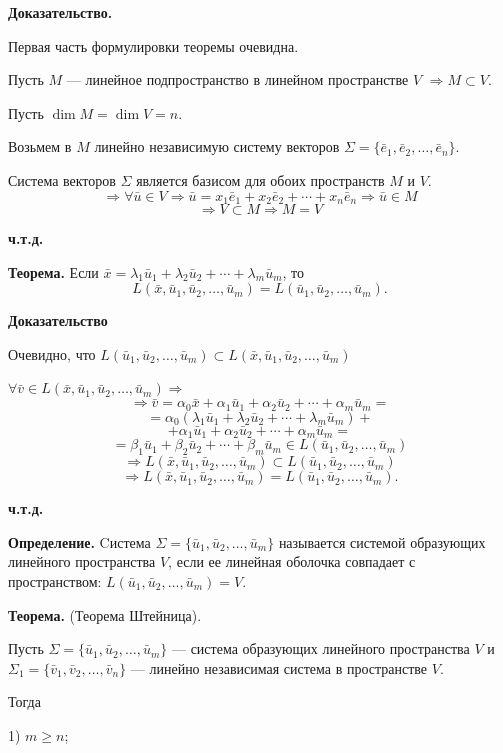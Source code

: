 \documentclass[12pt,a4paper]{article}
\newcommand{\vu}{\bar u}
\newcommand{\vv}{\bar v}
\newcommand{\vx}{\bar x}
\newcommand{\ve}{\bar e}
\begin{document}
\textbf{Доказательство.}

Первая часть формулировки теоремы очевидна.

Пусть $M$ --- линейное подпространство в линейном пространстве $V$
$\Rightarrow M \subset V$.

Пусть $\dim M = \dim V = n$.

Возьмем в $M$ линейно независимую систему векторов $\Sigma = \{\ve_1,
\ve_2, \ldots, \ve_n\}$.

Система векторов $\Sigma$ является базисом для обоих пространств $M$ и $V$.
$$
\Rightarrow \forall \vu \in V \Rightarrow \vu = x_1 \ve_1 + x_2 \ve_2
+ \cdots + x_n \ve_n \Rightarrow \vu \in M
$$
$$
\Rightarrow V \subset M \Rightarrow M = V
$$

\textbf{ч.т.д.}

\textbf{Теорема.} Если $\vx = \lambda_1 \vu_1 + \lambda_2 \vu_2 +
\cdots + \lambda_m \vu_m$, то
$$
L(\vx, \vu_1, \vu_2, \ldots, \vu_m) = L(\vu_1, \vu_2, \ldots, \vu_m).
$$

\textbf{Доказательство}

Очевидно, что $L(\vu_1, \vu_2, \ldots, \vu_m) \subset L(\vx, \vu_1,
\vu_2, \ldots, \vu_m)$

$\forall \vv \in L(\vx, \vu_1, \vu_2, \ldots, \vu_m) \Rightarrow$
$$
\Rightarrow \vv = \alpha_0 \vx + \alpha_1 \vu_1 + \alpha_2 \vu_2 +
\cdots + \alpha_m \vu_m =
$$
$$
= \alpha_0 (\lambda_1 \vu_1 + \lambda_2 \vu_2 + \cdots + \lambda_m \vu_m) +
$$
$$
+ \alpha_1 \vu_1 + \alpha_2 \vu_2 + \cdots + \alpha_m \vu_m =
$$
$$
= \beta_1 \vu_1 + \beta_2 \vu_2 + \cdots + \beta_m \vu_m \in L(\vu_1,
\vu_2, \ldots, \vu_m)
$$
$$
\Rightarrow L(\vx, \vu_1, \vu_2, \ldots, \vu_m) \subset L(\vu_1,
\vu_2, \ldots, \vu_m)
$$
$$
\Rightarrow L(\vx, \vu_1, \vu_2, \ldots, \vu_m) = L(\vu_1, \vu_2,
\ldots, \vu_m).
$$

\textbf{ч.т.д.}

\textbf{Определение.} Cистема $\Sigma = \{\vu_1, \vu_2, \ldots,
\vu_m\}$ называется системой образующих линейного пространства $V$,
если ее линейная оболочка совпадает с пространством: $L(\vu_1, \vu_2,
\ldots, \vu_m) = V$.

\textbf{Теорема.} (Теорема Штейница).

Пусть $\Sigma = \{\vu_1, \vu_2, \ldots, \vu_m\}$ --- система
образующих линейного пространства $V$ и $\Sigma_1 = \{\vv_1, \vv_2,
\ldots, \vv_n\}$ --- линейно независимая система в пространстве $V$.

Тогда

1) $m \ge n$;
\end{document}
